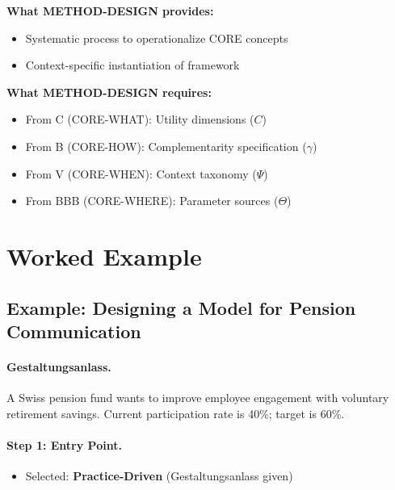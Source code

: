 \begin{tcolorbox}[colback=yellow!5!white, colframe=yellow!75!black,
    title=Integration: METHOD-DESIGN $\leftrightarrow$ CORE Appendices]
\textbf{What METHOD-DESIGN provides:}
\begin{itemize}[nosep]
\item Systematic process to operationalize CORE concepts
\item Context-specific instantiation of framework
\end{itemize}

\textbf{What METHOD-DESIGN requires:}
\begin{itemize}[nosep]
\item From C (CORE-WHAT): Utility dimensions ($C$)
\item From B (CORE-HOW): Complementarity specification ($\gamma$)
\item From V (CORE-WHEN): Context taxonomy ($\Psi$)
\item From BBB (CORE-WHERE): Parameter sources ($\Theta$)
\end{itemize}
\end{tcolorbox}



\section{Worked Example}
\label{sec:eee-example}

\subsection{Example: Designing a Model for Pension Communication}

\paragraph{Gestaltungsanlass.} A Swiss pension fund wants to improve employee
engagement with voluntary retirement savings. Current participation rate is 40\%;
target is 60\%.

\paragraph{Step 1: Entry Point.}
\begin{itemize}
\item Selected: \textbf{Practice-Driven} (Gestaltungsanlass given)
\end{itemize}

